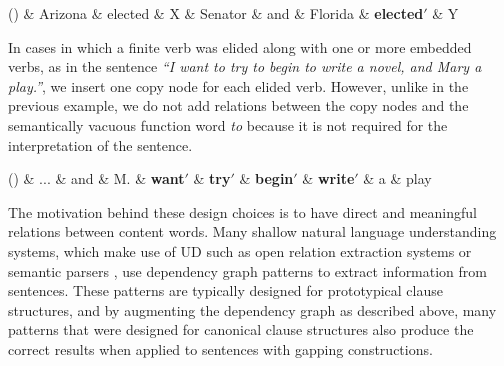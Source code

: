 \documentclass[lucida,biblatex]{sp} %
\newcounter{excounter}
\begin{document}
\begin{center}
\label{ex:en-gap-8}
\footnotesize
  \begin{dependency}[edge unit distance=2.5ex]
    \begin{deptext}[column sep=-0.05cm]
      (\theexcounter) \& Arizona \& elected \& X \& Senator \& and \& Florida \& \textbf{elected$'$} \& Y \\
    \end{deptext}
  \end{dependency}
\end{center}
In cases in which a finite verb was elided along with one or more embedded verbs, as in the sentence \textit{``I want to try to begin to write a novel, and Mary a play.''}, we insert one copy node for each elided verb. However, unlike in the previous example, we do not add relations between the copy nodes and the semantically vacuous function word \textit{to} because it is not required for the interpretation of the sentence.

\begin{center}
\label{ex:en-gap-9}
\footnotesize
  \begin{dependency}
    \begin{deptext}[column sep=0.1cm]
      (\theexcounter) \& ... \& and \& M. \& \textbf{want$'$} \& \textbf{try$'$} \& \textbf{begin$'$} \& \textbf{write$'$} \& a \& play \\
    \end{deptext}
  \end{dependency}
\end{center}

The motivation behind these design choices is to have direct and meaningful relations between content words. Many shallow natural language understanding systems, which make use of UD such as open relation extraction systems \citep{Mausam2012,Angeli2015} or semantic parsers \citep{Andreas2016,Reddy2017}, use dependency graph patterns to extract information from sentences. These patterns are typically designed for prototypical clause structures, and by augmenting the dependency graph as described above, many patterns that were designed for canonical clause structures also produce the correct results when applied to sentences with gapping constructions.
\end{document}
